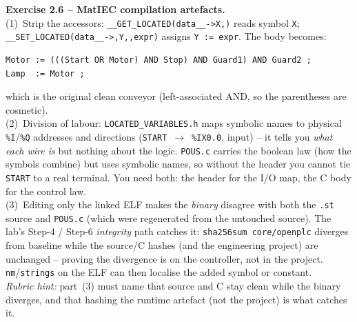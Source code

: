 \documentclass[11pt,a4paper]{article}
\begin{document}
\begin{solutionbox}
\textbf{Exercise 2.6 -- MatIEC compilation artefacts.}\\[2pt]
(1)~Strip the accessors: \texttt{\_\_GET\_LOCATED(data\_\_->X,)} reads symbol \texttt{X};
\texttt{\_\_SET\_LOCATED(data\_\_->,Y,,expr)} assigns \texttt{Y := expr}. The body becomes:
\begin{lstlisting}
Motor := (((Start OR Motor) AND Stop) AND Guard1) AND Guard2 ;
Lamp  := Motor ;
\end{lstlisting}
which is the original clean conveyor (left-associated AND, so the parentheses are cosmetic).\\
(2)~Division of labour: \texttt{LOCATED\_VARIABLES.h} maps symbolic names to physical
\texttt{\%I}/\texttt{\%Q} addresses and directions (\texttt{START}~$\to$~\texttt{\%IX0.0}, input) --
it tells you \emph{what each wire is} but nothing about the logic. \texttt{POUS.c} carries the
boolean law (how the symbols combine) but uses symbolic names, so without the header you cannot tie
\texttt{START} to a real terminal. You need both: the header for the I/O map, the C body for the
control law.\\
(3)~Editing only the linked ELF makes the \emph{binary} disagree with both the \texttt{.st} source
and \texttt{POUS.c} (which were regenerated from the untouched source). The lab's Step-4 / Step-6
\emph{integrity} path catches it: \texttt{sha256sum core/openplc} diverges from baseline while the
source/C hashes (and the engineering project) are unchanged -- proving the divergence is on the
controller, not in the project. \texttt{nm}/\texttt{strings} on the ELF can then localise the added
symbol or constant.\\[2pt]
\emph{Rubric hint:} part~(3) must name that source and C stay clean while the binary diverges, and
that hashing the runtime artefact (not the project) is what catches it.
\end{solutionbox}
\end{document}
